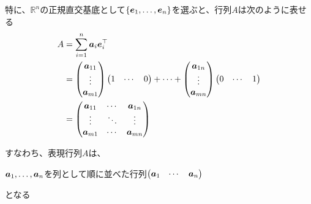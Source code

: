 \documentclass[../../../topic_linear-algebra]{subfiles}
\begin{document}
\sectionline

特に、$\mathbb{R}^n$の正規直交基底として$\{\vb*{e}_1,\ldots,\vb*{e}_n\}$を選ぶと、行列$A$は次のように表せる
\begin{align*}
  A & = \sum_{i=1}^n \vb*{a}_i \vb*{e}_i^\top                               \\
    & = \begin{pmatrix}
          \vb*{a}_{11} \\
          \vdots       \\
          \vb*{a}_{m1}
        \end{pmatrix} \begin{pmatrix}
                        1 & \cdots & 0 \\
                      \end{pmatrix} + \cdots + \begin{pmatrix}
                                                 \vb*{a}_{1n} \\
                                                 \vdots       \\
                                                 \vb*{a}_{mn}
                                               \end{pmatrix} \begin{pmatrix}
                                                               0 & \cdots & 1
                                                             \end{pmatrix} \\
    & = \begin{pmatrix}
          \vb*{a}_{11} & \cdots & \vb*{a}_{1n} \\
          \vdots       & \ddots & \vdots       \\
          \vb*{a}_{m1} & \cdots & \vb*{a}_{mn}
        \end{pmatrix}
\end{align*}

\br

すなわち、表現行列$A$は、
\begin{shaded}
  $\vb*{a}_1,\ldots,\vb*{a}_n$を列として順に並べた行列$\begin{pmatrix}  \vb*{a}_1 & \cdots & \vb*{a}_n\end{pmatrix}$
\end{shaded}
となる
\end{document}
